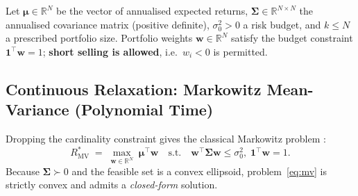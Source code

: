 \documentclass[11pt]{article}
\begin{document}
Let $\boldsymbol{\mu}\in\mathbb{R}^N$ be the vector of annualised expected
returns, $\boldsymbol{\Sigma}\in\mathbb{R}^{N\times N}$ the annualised
covariance matrix (positive definite), $\sigma_0^2>0$ a risk budget, and
$k\leq N$ a prescribed portfolio size.  Portfolio weights
$\mathbf{w}\in\mathbb{R}^N$ satisfy the budget constraint $\mathbf{1}^\top
\mathbf{w}=1$; \textbf{short selling is allowed}, i.e.\ $w_i<0$ is permitted.

\subsection{Continuous Relaxation: Markowitz Mean-Variance (Polynomial Time)}

Dropping the cardinality constraint gives the classical Markowitz problem
\cite{Markowitz1952}:
\begin{equation}
  R^*_{\text{MV}}
  \;=\;
  \max_{\mathbf{w}\in\mathbb{R}^N}\; \boldsymbol{\mu}^\top\mathbf{w}
  \quad\text{s.t.}\quad
  \mathbf{w}^\top\boldsymbol{\Sigma}\mathbf{w}\leq\sigma_0^2,\;
  \mathbf{1}^\top\mathbf{w}=1.
  \label{eq:mv}
\end{equation}
Because $\boldsymbol{\Sigma}\succ 0$ and the feasible set is a convex ellipsoid,
problem~\eqref{eq:mv} is strictly convex and admits a \emph{closed-form} solution.
\end{document}
